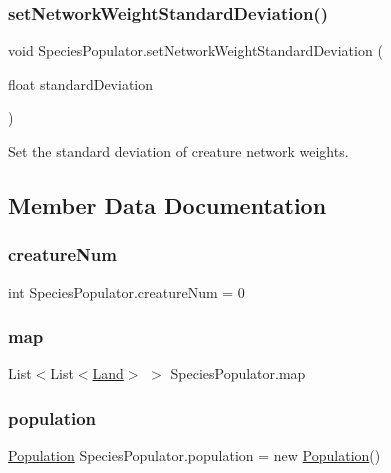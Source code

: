 \subsubsection{\texorpdfstring{set\+Network\+Weight\+Standard\+Deviation()}{setNetworkWeightStandardDeviation()}}
{\footnotesize\ttfamily void Species\+Populator.\+set\+Network\+Weight\+Standard\+Deviation (\begin{DoxyParamCaption}\item[{float}]{standard\+Deviation }\end{DoxyParamCaption})}



Set the standard deviation of creature network weights. 



\subsection{Member Data Documentation}
\mbox{\label{class_species_populator_ae63e5d9d4b3d8e83bf1c3c288d34a4d9}} 
\subsubsection{\texorpdfstring{creature\+Num}{creatureNum}}
{\footnotesize\ttfamily int Species\+Populator.\+creature\+Num = 0\hspace{0.3cm}{\ttfamily [static]}}

\mbox{\label{class_species_populator_a886b0f7ecb2a21621178d68b00d637e3}} 
\subsubsection{\texorpdfstring{map}{map}}
{\footnotesize\ttfamily List$<$List$<$\mbox{\hyperlink{class_land}{Land}}$>$ $>$ Species\+Populator.\+map}

\mbox{\label{class_species_populator_a119d16beaafe55f1a49d26daa08fcc5a}} 
\subsubsection{\texorpdfstring{population}{population}}
{\footnotesize\ttfamily \mbox{\hyperlink{class_population}{Population}} Species\+Populator.\+population = new \mbox{\hyperlink{class_population}{Population}}()}



